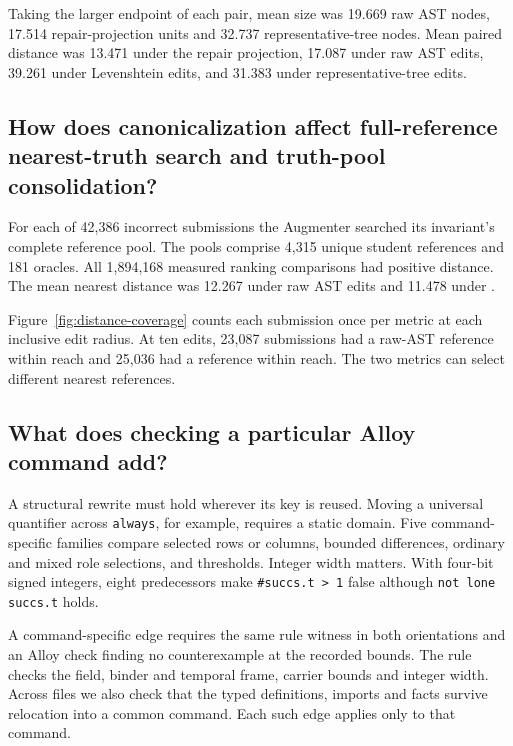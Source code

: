 Taking the larger endpoint of each pair, mean size was 19.669 raw AST
nodes, 17.514 repair-projection units and 32.737 representative-tree
nodes. Mean paired distance was 13.471 under the repair projection,
17.087 under raw AST edits, 39.261 under Levenshtein edits, and
31.383 under representative-tree edits.

\subsection{How does canonicalization affect full-reference nearest-truth search and truth-pool consolidation?}
\label{sec:eval-augmenter}

For each of 42,386 incorrect submissions the Augmenter searched its
invariant's complete reference pool. The pools comprise 4,315 unique
student references and 181 oracles. All 1,894,168 measured ranking
comparisons had positive distance. The mean nearest distance was 12.267
under raw AST edits and 11.478 under \CanDis{}.



Figure~\ref{fig:distance-coverage} counts each submission once per metric
at each inclusive edit radius. At ten edits, 23,087 submissions had a raw-AST
reference within reach and 25,036 had a \CanDis{} reference within reach.
The two metrics can select different nearest references.

\subsection{What does checking a particular Alloy command add?}
\label{sec:scoped-pools}

A structural rewrite must hold wherever its key is reused. Moving a universal
quantifier across \texttt{always}, for example, requires a static domain.
Five command-specific families compare selected rows or columns, bounded
differences, ordinary and mixed role selections, and thresholds. Integer
width matters. With four-bit signed integers, eight predecessors make
\texttt{\#succs.t > 1} false although \texttt{not lone succs.t} holds.

A command-specific edge requires the same rule witness in both orientations
and an Alloy check finding no counterexample at the recorded bounds.
The rule checks the field, binder and temporal frame, carrier bounds and
integer width. Across files we also check that the typed definitions, imports
and facts survive relocation into a common command. Each such edge applies
only to that command.

